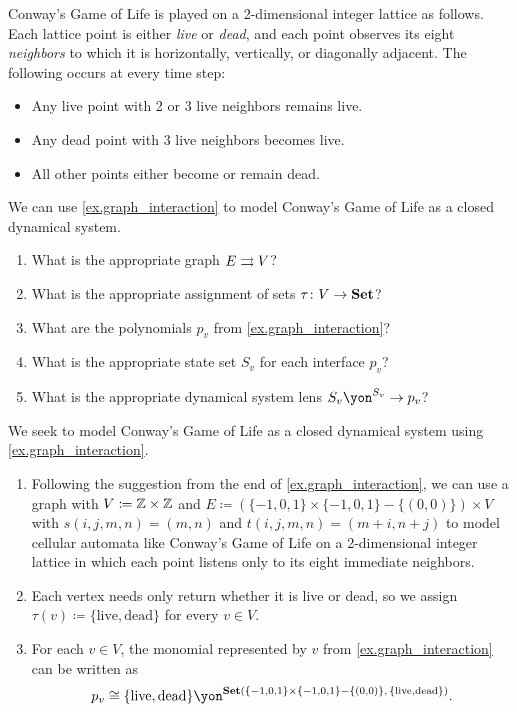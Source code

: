 \documentclass[Book-Poly]{subfiles}
\begin{document}
\begin{exercise}\label{exc.conway}
Conway's Game of Life is played on a 2-dimensional integer lattice as follows.
Each lattice point is either \emph{live} or \emph{dead}, and each point observes its eight \emph{neighbors} to which it is horizontally, vertically, or diagonally adjacent.
The following occurs at every time step:
\begin{itemize}
    \item Any live point with 2 or 3 live neighbors remains live.
    \item Any dead point with 3 live neighbors becomes live.
    \item All other points either become or remain dead.
\end{itemize}
We can use \cref{ex.graph_interaction} to model Conway's Game of Life as a closed dynamical system.
\begin{enumerate}
	\item What is the appropriate graph $E\rightrightarrows V$?
	\item What is the appropriate assignment of sets $\tau\colon V\to\mathbf{Set}$?
	\item What are the polynomials $p_v$ from \cref{ex.graph_interaction}?
	\item What is the appropriate state set $S_v$ for each interface $p_v$?
	\item What is the appropriate dynamical system lens $S_v\yon^{S_v}\to p_v$?
\qedhere
\end{enumerate}
\begin{solution}
We seek to model Conway's Game of Life as a closed dynamical system using \cref{ex.graph_interaction}.
\begin{enumerate}
    \item Following the suggestion from the end of \cref{ex.graph_interaction}, we can use a graph with $V\coloneq\mathbb{Z}\times\mathbb{Z}$ and $E\coloneqq(\{-1,0,1\}\times\{-1,0,1\}-\{(0,0)\})\times V$ with $s(i,j,m,n)=(m,n)$ and $t(i,j,m,n)=(m+i,n+j)$ to model cellular automata like Conway's Game of Life on a 2-dimensional integer lattice in which each point listens only to its eight immediate neighbors.
    \item Each vertex needs only return whether it is live or dead, so we assign $\tau(v)\coloneqq\{\text{live},\text{dead}\}$ for every $v\in V$.
    \item For each $v\in V$, the monomial represented by $v$ from \cref{ex.graph_interaction} can be written as
    \[
        p_v\iso\{\text{live},\text{dead}\}\yon^{\smset(\{-1,0,1\}\times\{-1,0,1\}-\{(0,0)\},\, \{\text{live},\text{dead}\})}.
\]
\end{enumerate}
\end{solution}
\end{exercise}
\end{document}
